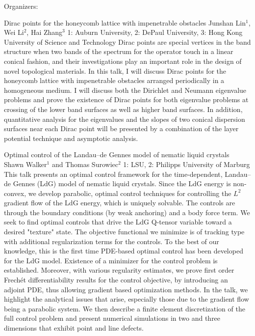 \label{mini18}

\miniabs
{}
{Organizers: }
{}


\vspace{2ex}
\abs
{Dirac points for the honeycomb lattice with impenetrable obstacles}
{Junshan Lin$^{1}$, Wei Li$^{2}$, Hai Zhang$^{3}$}
{1: Auburn University, 2: DePaul University, 3: Hong Kong University of Science and Technology}
{Dirac points are special vertices in the band structure when two bands of the spectrum for the operator touch in a linear conical fashion, and their investigations play an important role in the design of novel topological materials. In this talk, I will discuss Dirac points for the honeycomb lattice with impenetrable obstacles arranged periodically in a homogeneous medium. I will discuss both the Dirichlet and Neumann eigenvalue problems and prove the existence of Dirac points for both eigenvalue problems at crossing of the lower band surfaces as well as higher band surfaces. In addition, quantitative analysis for the eigenvalues and the slopes of two conical dispersion surfaces near each Dirac point will be presented by a combination of the layer potential technique and asymptotic analysis.}


\vspace{1.5ex}
\abs
{Optimal control of the Landau--de Gennes model of nematic liquid crystals}
{Shawn Walker$^{1}$ and Thomas Surowiec$^{2}$}
{1: LSU, 2: Philipps University of Marburg}
{This talk presents an optimal control framework for the time-dependent, Landau--de Gennes (LdG) model of nematic liquid crystals.  Since the LdG energy is non-convex, we develop parabolic, optimal control techniques for controlling the $L^2$ gradient flow of the LdG energy, which is uniquely solvable.  The controls are through the boundary conditions (by weak anchoring) and a body force term. We seek to find optimal controls that drive the LdG Q-tensor variable toward a desired "texture" state.  The objective functional we minimize is of tracking type with additional regularization terms for the controls.  To the best of our knowledge, this is the first time PDE-based optimal control has been developed for the LdG model. Existence of a minimizer for the control problem is established.  Moreover, with various regularity estimates, we prove first order Frech\'{e}t differentiability results for the control objective, by introducing an adjoint PDE, thus allowing gradient based optimization methods.  In the talk, we highlight the analytical issues that arise, especially those due to the gradient flow being a parabolic system.  We then describe a finite element discretization of the full control problem and present numerical simulations in two and three dimensions that exhibit point and line defects.}


